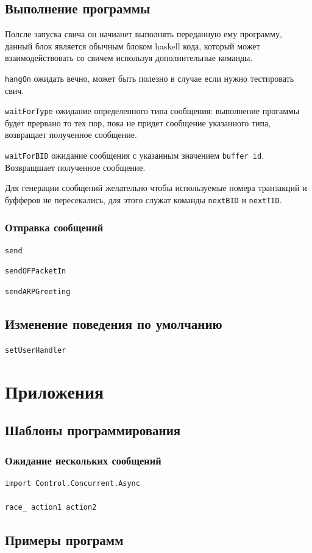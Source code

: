 \documentclass[9pt,a4paper]{article}
\begin{document}
\subsection{Выполнение программы}
Полсле запуска  свича он начианет выполнять переданную ему программу, данный блок 
является обычным блоком haskell кода, который может взаимодействовать со свичем
используя дополнительные команды.

\lstinline!hangOn! ожидать вечно, может быть полезно в случае если нужно тестировать
свич.

\lstinline!waitForType! ожидание определенного типа сообщения: выполнение прогаммы
будет прервано то тех пор, пока не придет сообщение указанного типа, возвращает 
полученное сообщение.

\lstinline!waitForBID! ожидание сообщения с указанным значением \texttt{buffer id}.
Возвращшает полученное сообщение.

Для генерации сообщений желательно чтобы используемые номера транзакций и буфферов 
не пересекались, для этого служат команды \lstinline!nextBID! и \lstinline!nextTID!.

\subsubsection{Отправка сообщений}

\lstinline!send!

\lstinline!sendOFPacketIn!

\lstinline!sendARPGreeting!

\subsection{Изменение поведения по умолчанию}

\lstinline!setUserHandler!

\section{Приложения}
\subsection{Шаблоны программирования}
\subsubsection{Ожидание нескольких сообщений}

\begin{lstlisting}
import Control.Concurrent.Async

race_ action1 action2
\end{lstlisting}

\subsection{Примеры программ}
\end{document}
